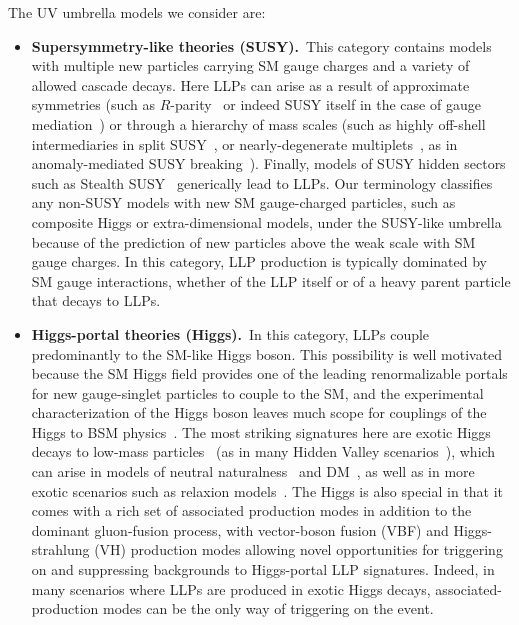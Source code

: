 The UV umbrella models we consider are:
%
\begin{itemize}

\item {\bf Supersymmetry-like theories (SUSY).}~This category contains models with multiple new particles carrying SM gauge charges and a variety of allowed cascade decays.
Here LLPs can arise as a result of approximate symmetries (such as $R$-parity~\cite{Barbier:2004ez} or indeed SUSY itself in the case of gauge mediation~\cite{Dimopoulos:1996vz}) or through a hierarchy of mass scales (such as highly off-shell intermediaries in split SUSY~\cite{ArkaniHamed:2004fb}, or nearly-degenerate multiplets~\cite{Chen:1995yu,Thomas:1998wy,Byrne:2003sa}, as in anomaly-mediated SUSY breaking~\cite{Feng:1999fu}).  Finally, models of SUSY hidden sectors such as Stealth SUSY~\cite{Fan:2011yu} generically lead to LLPs. 
Our terminology classifies any non-SUSY models with new SM gauge-charged particles, such as composite Higgs or extra-dimensional models, under the SUSY-like umbrella because of the prediction of new particles above the weak scale with SM gauge charges.  In this category, LLP production is typically dominated by SM gauge interactions, whether of the LLP itself or of a heavy parent particle that decays to LLPs.

\item {\bf Higgs-portal theories (Higgs).}~In this category, LLPs couple predominantly to the SM-like Higgs boson.
This possibility is well motivated because the SM Higgs field provides one of the leading renormalizable portals for new gauge-singlet particles to couple to the SM, and the experimental characterization of the Higgs boson leaves much scope for couplings of the Higgs to BSM physics~\cite{Khachatryan:2014jba,Aad:2015pla}.
The most striking signatures here are exotic Higgs decays to low-mass particles~\cite{Curtin:2013fra} (as in many Hidden Valley scenarios~\cite{Strassler:2006im,Strassler:2006ri}), which can arise in models of neutral naturalness~\cite{Chacko:2005pe,Burdman:2006tz,Craig:2015pha} and DM~\cite{Silveira:1985rk}, as well as in more exotic scenarios such as relaxion models~\cite{Beauchesne:2017ukw}.
The Higgs is also special in that it comes with a rich set of associated production modes in addition to the dominant gluon-fusion process, with vector-boson fusion (VBF) and Higgs-strahlung (VH) production modes allowing novel opportunities for triggering on and suppressing backgrounds to Higgs-portal LLP signatures.
Indeed, in many scenarios where LLPs are produced in exotic Higgs decays, associated-production modes can be the only way of triggering on the event.


\end{itemize}
